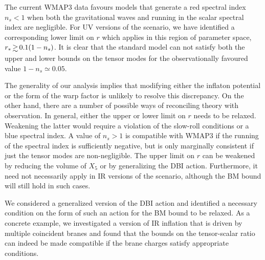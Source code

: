 The current WMAP3 data 
favours models that generate a red spectral index $n_s<1$
when both the gravitational waves and running in the scalar 
spectral index are negligible. For UV versions of the scenario, 
we have identified a corresponding 
lower limit on $r$ which applies in this region of 
parameter space, $r_* \, \gsim \, 0.1 (1-n_s)$. It is clear that 
the standard model 
can not satisfy both the upper and lower bounds 
on the tensor modes for the observationally favoured value 
$1-n_s \simeq 0.05$.

The generality of our 
analysis implies that modifying either the inflaton potential 
or the form of the warp factor is unlikely to resolve this discrepancy. 
On the other hand, there are a number of possible ways of reconciling  
theory with observation. In general, 
either the upper or lower limit on $r$ needs to be relaxed. 
Weakening the latter would require a violation of the slow-roll 
conditions or a blue spectral index. 
A value of $n_s >1$ is compatible with WMAP3 if the running of the 
spectral index 
is sufficiently negative, but is only marginally
consistent if just the tensor modes are non-negligible.  The 
upper limit on $r$ can be weakened by reducing 
the volume of $X_5$ or 
by generalizing the DBI action. Furthermore, it need not necessarily 
apply in IR versions of the scenario, although the BM bound will still hold
in such cases. 

We considered a generalized version of the 
DBI action and identified a necessary condition on the form of such  
an action for the BM bound to be relaxed.
As a concrete example, 
we investigated a version of IR inflation that is driven by 
multiple coincident branes and found that  
the bounds on the tensor-scalar ratio can indeed 
be made compatible if the brane charges satisfy appropriate 
conditions.   

